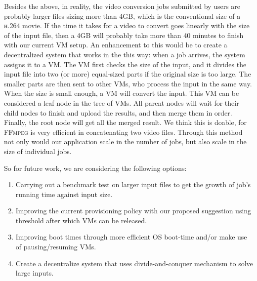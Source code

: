 Besides the above, in reality, the video conversion jobs submitted by
users are probably larger files sizing more than 4GB, which is the
conventional size of a \textsc{h.264} movie. If the time it takes for
a video to convert goes linearly with the size of the input file, then
a 4GB will probably take more than 40 minutes to finish with our
current VM setup. An enhancement to this would be to create a
decentralized system that works in the this way: when a job arrives,
the system assigns it to a VM. The VM first checks the size of the
input, and it divides the input file into two (or more) equal-sized
parts if the original size is too large.  The smaller parts are then
sent to other VMs, who process the input in the same way. When the
size is small enough, a VM will convert the input. This VM can be
considered a leaf node in the tree of VMs. All parent nodes will wait
for their child nodes to finish and upload the results, and then merge
them in order. Finally, the root node will get all the merged
result. We think this is doable, for \textsc{FFmpeg} is very efficient
in concatenating two video files. Through this method not only would
our application scale in the number of jobs, but also scale in the
size of individual jobs.

So for future work, we are considering the following options:
\begin{enumerate}
\item Carrying out a benchmark test on larger input files to get the
  growth of job's running time against input size.

\item Improving the current provisioning policy with our proposed
  suggestion using threshold after which VMs can be released.
\item Improving boot times through more efficient OS boot-time and/or
  make use of pausing/resuming VMs.

\item Create a decentralize system that uses divide-and-conquer
  mechanism to solve large inputs.

\end{enumerate}




